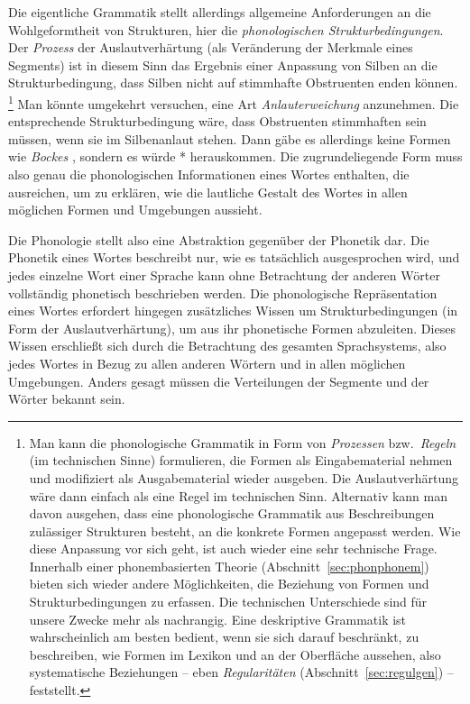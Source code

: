 Die eigentliche Grammatik stellt allerdings allgemeine Anforderungen an die Wohlgeformtheit von Strukturen, hier die \textit{phonologischen Strukturbedingungen}.
Der \textit{Prozess} der Auslautverhärtung (als Veränderung der Merkmale eines Segments) ist in diesem Sinn das Ergebnis einer Anpassung von Silben an die Strukturbedingung, dass Silben nicht auf stimmhafte Obstruenten enden können.%
\footnote{Man kann die phonologische Grammatik in Form von \textit{Prozessen} bzw.\ \textit{Regeln} (im technischen Sinne) formulieren, die Formen als Eingabematerial nehmen und modifiziert als Ausgabematerial wieder ausgeben.
Die Auslautverhärtung wäre dann einfach als eine Regel im technischen Sinn.
Alternativ kann man davon ausgehen, dass eine phonologische Grammatik aus Beschreibungen zulässiger Strukturen besteht, an die konkrete Formen angepasst werden.
Wie diese Anpassung vor sich geht, ist auch wieder eine sehr technische Frage.
Innerhalb einer phonembasierten Theorie (Abschnitt~\ref{sec:phonphonem}) bieten sich wieder andere Möglichkeiten, die Beziehung von Formen und Strukturbedingungen zu erfassen.
Die technischen Unterschiede sind für unsere Zwecke mehr als nachrangig.
Eine deskriptive Grammatik ist wahrscheinlich am besten bedient, wenn sie sich darauf beschränkt, zu beschreiben, wie Formen im Lexikon und an der Oberfläche aussehen, also systematische Beziehungen -- eben \textit{Regularitäten} (Abschnitt~\ref{sec:regulgen}) -- feststellt.}
Man könnte umgekehrt versuchen, eine Art \textit{Anlauterweichung} anzunehmen.
Die entsprechende Strukturbedingung wäre, dass Obstruenten stimmhaften sein müssen, wenn sie im Silbenanlaut stehen.
Dann gäbe es allerdings keine Formen wie \textit{Bockes} \textipa{[bOk@s]}, sondern es würde *\textipa{[bOg@s]} herauskommen.
Die zugrundeliegende Form muss also genau die phonologischen Informationen eines Wortes enthalten, die ausreichen, um zu erklären, wie die lautliche Gestalt des Wortes in allen möglichen Formen und Umgebungen aussieht.


Die Phonologie stellt also eine Abstraktion gegenüber der Phonetik dar.
Die Phonetik eines Wortes beschreibt nur, wie es tatsächlich ausgesprochen wird, und jedes einzelne Wort einer Sprache kann ohne Betrachtung der anderen Wörter vollständig phonetisch beschrieben werden.
Die phonologische Repräsentation eines Wortes erfordert hingegen zusätzliches Wissen um Strukturbedingungen (\zB in Form der Auslautverhärtung), um aus ihr phonetische Formen abzuleiten.
Dieses Wissen erschließt sich durch die Betrachtung des gesamten Sprachsystems, also jedes Wortes in Bezug zu allen anderen Wörtern und in allen möglichen Umgebungen.
Anders gesagt müssen die Verteilungen der Segmente und der Wörter bekannt sein.

